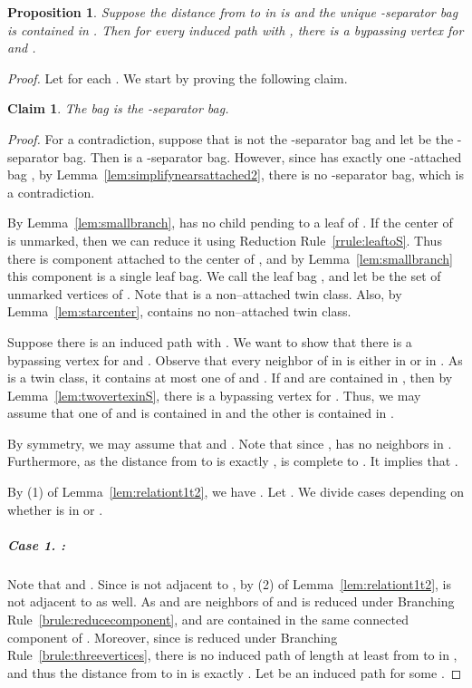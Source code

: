 \documentclass[11pt]{elsarticle}
\newtheorem{PROP}[theorem]{Proposition}
\newtheorem{claim}{Claim}
\newenvironment{clproof}{\begin{list}{}{\setlength{\leftmargin}{5mm}} \item {\it Proof.} }{\hfill\end{list}\medskip}
\begin{document}
\begin{PROP}
  \label{prop:anticomplete2}
  Suppose the distance from  to  in  is  and the unique -separator bag is contained in .
  Then for every induced path  with , 
  there is a bypassing vertex for  and .
\end{PROP}
\begin{proof}
Let  for each . 
 We start by proving the following claim.
\begin{claim}
The bag  is the -separator bag.
\end{claim}
\begin{clproof}
For a contradiction, suppose that  is not the -separator bag and let  be the -separator bag.
Then  is a -separator bag.
However, since  has exactly one -attached bag , 
by Lemma~\ref{lem:simplifynearsattached2}, 
there is no -separator bag, which is a contradiction.
\end{clproof}

By Lemma~\ref{lem:smallbranch},  has no child pending to a leaf of .
If the center of  is unmarked, then we can reduce it using Reduction Rule~\ref{rrule:leaftoS}.
Thus there is component attached to the center of , and by Lemma~\ref{lem:smallbranch} this component is a single leaf bag.
We call the leaf bag , and let  be the set of unmarked vertices of . Note that  is a non--attached twin class.
Also, by Lemma~\ref{lem:starcenter},  contains no non--attached twin class.




Suppose  there is an induced path  with .
We want to show that there is a bypassing vertex for  and .
Observe that every neighbor of  in  is either in  or in .
As  is a twin class, it contains at most one of  and .
If  and  are contained in , then by Lemma~\ref{lem:twovertexinS}, there is a bypassing vertex for .
Thus, we may assume that one of  and  is contained in  and the other is contained in .




By symmetry, we may assume that  and .
Note that since ,  has no neighbors in .
Furthermore, 
as the distance from  to  is exactly ,  is complete to .
It implies that .

By (1) of Lemma~\ref{lem:relationt1t2}, we have .
Let .
We divide cases depending on whether  is in  or .

\subparagraph{\textbf{Case 1.} :}  

Note that  and .
Since  is not adjacent to , by (2) of Lemma~\ref{lem:relationt1t2},
 is not adjacent to  as well. As  and  are neighbors of  and  is reduced under Branching Rule~\ref{brule:reducecomponent}, 
 and  are contained in the same connected component of . Moreover, since  is reduced under Branching Rule~\ref{brule:threevertices}, 
there is no induced path of length at least  from  to  in , 
and thus the distance from  to  in  is exactly .
Let  be an induced path for some . 


\end{proof}
\end{document}
